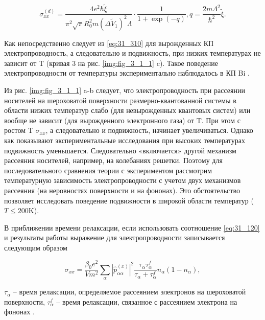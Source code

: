 \begin{equation} \label{eq:31_310}
\sigma _{xx}^{(d)} =\frac{4e^{2} \hbar \tilde{\xi }}{\pi ^{2} \sqrt{\pi } R_{0}^{2} m\left(\Delta \tilde{V}_{1} \right)^{2} \Lambda } \cdot \frac{{\mathrm 1}}{1+{\exp}(-q)} , q=\frac{2m\Lambda ^{2} }{\hbar ^{2} } \tilde{\xi }.  
\end{equation}

Как непосредственно следует из \eqref{eq:31_310} для вырожденных КП электропроводность, а следовательно и подвижность, при низких температурах не зависит от T (кривая 3 на рис. \ref{img:fig_3_1_1} c). Такое поведение электропроводности от температуры экспериментально наблюдалось в КП Bi \cite{Lin2000,Heremans1998,Zhang2000,Heremans2000,Gitsu2003,Nikolaeva2006,Gitsu2005}.

Из рис. \ref{img:fig_3_1_1} a-b следует, что электропроводность при рассеянии носителей на шероховатой поверхности размерно-квантованной системы в области низких температур слабо (для невырожденных квантовых систем) или вообще не зависит (для вырожденного электронного газа) от T. При этом с ростом T $\sigma _{xx} $, а следовательно и подвижность, начинает увеличиваться. Однако как показывают экспериментальные исследования \cite{Zhang2000,Gitsu2003,Nikolaeva2006} при высоких температурах подвижность уменьшается. Следовательно «включается» другой механизм рассеяния носителей, например, на колебаниях решетки. Поэтому для последовательного сравнения теории с экспериментом рассмотрим температурную зависимость электропроводности с учетом двух механизмов рассеяния (на неровностях поверхности и на фононах). Это обстоятельство позволяет исследовать поведение подвижности в широкой области температур ($T\le 200\text{K}$).

В приближении времени релаксации, если использовать соотношение \eqref{eq:31_120} и результаты работы \cite{Khamidullin2002} выражение для электропроводности записывается следующим образом

\begin{equation} \label{eq:31_320}
\sigma _{xx} =\frac{\beta _{0} e^{2} }{Vm^{2} } \sum _{\alpha }\left|\hat{p}_{\alpha \alpha _{} }^{(x)} \right|^{2} \frac{\tau _{\alpha } \tau _{\alpha }^{f} }{\tau _{\alpha } +\tau _{\alpha }^{f} } n_{\alpha } \left(1-n_{\alpha } \right),
\end{equation}

\noindent $\tau _{\alpha } $ -- время релаксации, определяемое рассеянием электронов на шероховатой поверхности, $\tau _{\alpha }^{f} $ -- время релаксации, связанное с рассеянием электрона на фононах \cite{Khamidullin2002}.

